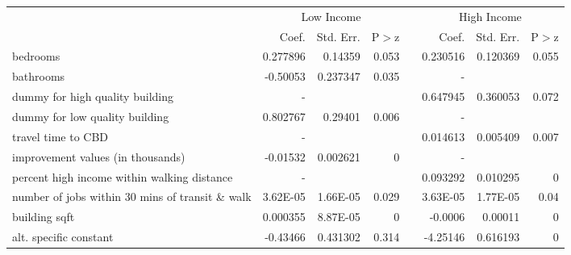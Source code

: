 \begin{tabular}{p{2in}rrrrrrr}

           &      \multicolumn{ 3}{c}{Low Income} &            &     \multicolumn{ 3}{c}{High Income} \\

           &      Coef. &  Std. Err. &        P$>$z &            &      Coef. &  Std. Err. &        P$>$z \\
\hline
  bedrooms &   0.277896 &    0.14359 &      0.053 &            &   0.230516 &   0.120369 &      0.055 \\

 bathrooms &   -0.50053 &   0.237347 &      0.035 &            &          - &            &            \\

dummy for high quality building &          - &            &            &            &   0.647945 &   0.360053 &      0.072 \\

dummy for low quality building &   0.802767 &    0.29401 &      0.006 &            &          - &            &            \\

travel time to CBD &          - &            &            &            &   0.014613 &   0.005409 &      0.007 \\

improvement values (in thousands) &   -0.01532 &   0.002621 &          0 &            &          - &            &            \\

percent high income within walking distance &          - &            &            &            &   0.093292 &   0.010295 &          0 \\

number of jobs within 30 mins of transit \& walk &   3.62E-05 &   1.66E-05 &      0.029 &            &   3.63E-05 &   1.77E-05 &       0.04 \\

building sqft &   0.000355 &   8.87E-05 &          0 &            &    -0.0006 &    0.00011 &          0 \\

alt. specific constant &   -0.43466 &   0.431302 &      0.314 &            &   -4.25146 &   0.616193 &          0 \\
\hline
\end{tabular}  

